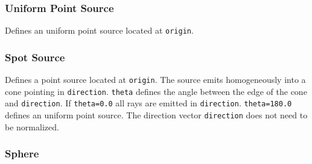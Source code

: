 \documentclass[10pt,a4paper,titlepage]{article}
\begin{document}
\subsubsection{Uniform Point Source}







\vspace{0.25cm}
Defines an uniform point source located at {\tt origin}. 


\subsubsection{Spot Source}









\vspace{0.25cm}
Defines a point source located at {\tt origin}. The source emits homogeneously into a cone pointing in {\tt direction}. {\tt theta} defines the angle between the edge of the cone and {\tt direction}. If {\tt theta=0.0} all rays are emitted in {\tt direction}. {\tt theta=180.0} defines an uniform point source. The direction vector {\tt direction} does not need to be normalized.

\subsubsection{Sphere}




\end{document}
